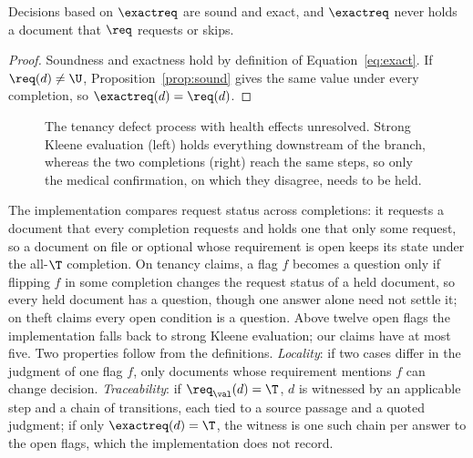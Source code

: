 \begin{proposition}
\label{prop:exact}
Decisions based on $\exactreq$ are sound and exact, and $\exactreq$ never holds a document that $\req$ requests or skips.
\end{proposition}
\begin{proof}
Soundness and exactness hold by definition of Equation~\eqref{eq:exact}. If $\req(d)\neq\U$, Proposition~\ref{prop:sound} gives the same value under every completion, so $\exactreq(d)=\req(d)$.
\end{proof}

\begin{figure}[t]
\centering
{}
\caption{The tenancy defect process with health effects unresolved. Strong Kleene evaluation (left) holds everything downstream of the branch, whereas the two completions (right) reach the same steps, so only the medical confirmation, on which they disagree, needs to be held.}
\label{fig:reconverge}
\end{figure}

The implementation compares request status across completions: it requests a document that every completion requests and holds one that only some request, so a document on file or optional whose requirement is open keeps its state under the all-$\T$ completion. On tenancy claims, a flag $f$ becomes a question only if flipping $f$ in some completion changes the request status of a held document, so every held document has a question, though one answer alone need not settle it; on theft claims every open condition is a question. Above twelve open flags the implementation falls back to strong Kleene evaluation; our claims have at most five. Two properties follow from the definitions. \emph{Locality}: if two cases differ in the judgment of one flag $f$, only documents whose requirement mentions $f$ can change decision. \emph{Traceability}: if $\req_\val(d)=\T$, $d$ is witnessed by an applicable step and a chain of transitions, each tied to a source passage and a quoted judgment; if only $\exactreq(d)=\T$, the witness is one such chain per answer to the open flags, which the implementation does not record.


